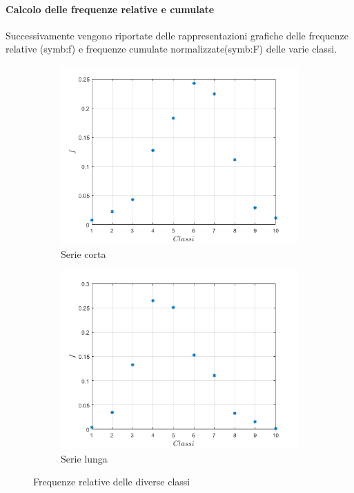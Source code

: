 \paragraph{Calcolo delle frequenze relative e cumulate}
Successivamente vengono riportate delle rappresentazioni grafiche 
delle frequenze relative (\gls{symb:f}) e frequenze cumulate normalizzate(\gls{symb:F}) delle varie classi.



\begin{figure}
	
	\begin{subfigure}{0.5\textwidth}
		\centering
		\includegraphics[width=\linewidth]{chapters/1-misureT/relshort}
		\caption{Serie corta}
		\label{fig:relshort}
	\end{subfigure}%
	\begin{subfigure}{0.5\textwidth}
		\centering
		\includegraphics[width=\linewidth]{chapters/1-misureT/rellong}
		\caption{Serie lunga}
		\label{fig:rellong}
	\end{subfigure}
	\caption{Frequenze relative delle diverse classi}
	\label{fig:relboth}
\end{figure}

